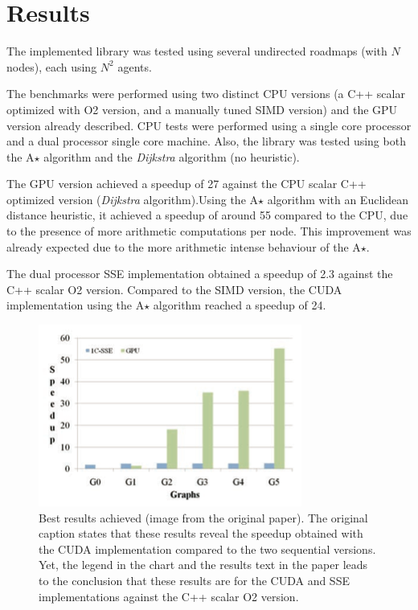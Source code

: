 \section{Results}

The implemented library was tested using several undirected roadmaps (with $N$ nodes), each using $N^2$ agents.

The benchmarks were performed using two distinct CPU versions (a C++ scalar optimized with O2 version, and a manually tuned SIMD version) and the GPU version already described. CPU tests were performed using a single core processor and a dual processor single core machine. Also, the library was tested using both the A$\star$ algorithm and the \textit{Dijkstra} algorithm (no heuristic).

The GPU version achieved a speedup of 27 against the CPU scalar C++ optimized version (\textit{Dijkstra} algorithm).Using the A$\star$ algorithm with an Euclidean distance heuristic, it achieved a speedup of around 55 compared to the CPU, due to the presence of more arithmetic computations per node.
This improvement was already expected due to the more arithmetic intense behaviour of the A$\star$.

The dual processor SSE implementation obtained a speedup of 2.3 against the C++ scalar O2 version. Compared to the SIMD version, the CUDA implementation using the A$\star$ algorithm reached a speedup of 24.

\begin{figure}[!htp]
	\centering
	\includegraphics[width=\columnwidth]{images/speedups.png}
	\caption{Best results achieved (image from the original paper). The original caption states that these results reveal the speedup obtained with the CUDA implementation compared to the two sequential versions. Yet, the legend in the chart and the results text in the paper leads to the conclusion that these results are for the CUDA and SSE implementations against the C++ scalar O2 version.}
\end{figure}
